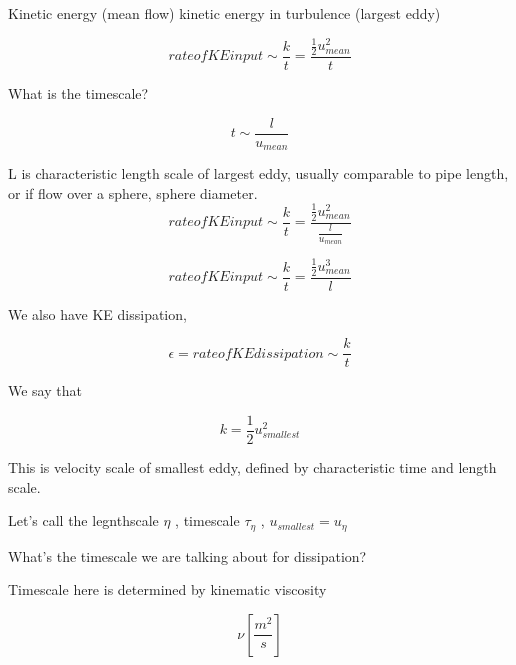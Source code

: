 \documentclass[12pt]{article}
\renewcommand{\_}{\kern-1.5pt\textunderscore\kern-1.5pt}
\begin{document}
\begin{itemize}

\par


\vspace{\baselineskip}
Kinetic energy (mean flow)  kinetic energy in turbulence (largest eddy)\par

 \[ rate of KE input \sim \frac{k}{t}=\frac{\frac{1}{2}u_{mean}^{2}}{t} \] \par

What is the timescale?\par

 \[ t \sim \frac{l}{u_{mean}} \] \par

L is characteristic length scale of largest eddy, usually comparable to pipe length, or if flow over a sphere, sphere diameter. \(  \)  \[ rate of KE input \sim \frac{k}{t}=\frac{\frac{1}{2}u_{mean}^{2}}{\frac{l}{u_{mean}}} \] \par

 \[ rate of KE input \sim \frac{k}{t}=\frac{\frac{1}{2}u_{mean}^{3}}{l} \] \par


\vspace{\baselineskip}
We also have KE dissipation,\par

 \[  \epsilon =rate of KE dissipation \sim \frac{k}{t} \] \par

We say that\par

 \[ k=\frac{1}{2}u_{smallest}^{2} \] \par

This is velocity scale of smallest eddy, defined by characteristic time and length scale.\par

Let’s call the legnthscale  \(  \eta  \) , timescale  \(  \tau_{ \eta } \) ,  \( u_{smallest}=u_{ \eta } \) \par


\vspace{\baselineskip}
What’s the timescale we are talking about for dissipation?\par

Timescale here is determined by kinematic viscosity\par

 \[  \nu   \left[ \frac{m^{2}}{s} \right]  \] \par


\end{itemize}
\end{document}
